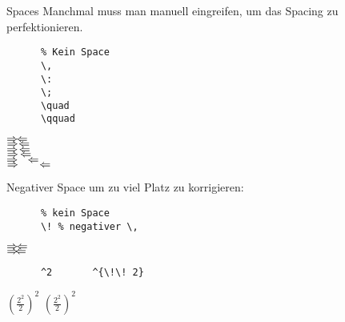 \begin{frame}[fragile]{Spaces}
  Manchmal muss man manuell eingreifen, um das Spacing zu perfektionieren.
  \vspace{-1em}
  \begin{CodeExample}{0.49}
    \begin{verbatim}
      % Kein Space
      \,
      \:
      \;
      \quad
      \qquad
    \end{verbatim}
  \CodeResult
    \strut
    $\Rightarrow\mspace{-2mu} \Leftarrow$ \\
    $\Rightarrow\mspace{-2mu} \,\Leftarrow$ \\
    $\Rightarrow\mspace{-2mu} \:\Leftarrow$ \\
    $\Rightarrow\mspace{-2mu} \;\Leftarrow$ \\
    $\Rightarrow\mspace{-2mu} \quad\Leftarrow$ \\
    $\Rightarrow\mspace{-2mu} \qquad\Leftarrow$
  \end{CodeExample}
  Negativer Space um zu viel Platz zu korrigieren:
  \vspace{-1em}
  \begin{CodeExample}{0.49}
    \begin{verbatim}
      % kein Space
      \! % negativer \,
    \end{verbatim}
  \CodeResult
    \strut
    $\Rightarrow\mspace{-2mu} \Leftarrow$ \\
    $\Rightarrow\mspace{-2mu} \!\Leftarrow$
  \end{CodeExample}
  \begin{CodeExample}{0.49}
    \begin{verbatim}
      ^2       ^{\!\! 2}

    \end{verbatim}
  \CodeResult
    \begin{minipage}[c][2\baselineskip][c]{\textwidth}
      ${\displaystyle \left( \frac{2^2}{2} \right)^2}$
      \qquad
      ${\displaystyle \left( \frac{2^2}{2} \right)^{\!\! 2}}$
    \end{minipage}
  \end{CodeExample}
\end{frame}

